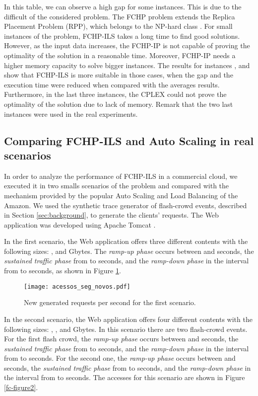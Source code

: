 	In this table, we can observe a high gap for some instances. This is due to the difficult of the considered problem. The FCHP problem extends the Replica Placement Problem (RPP), which belongs to the NP-hard class \cite{aioffi05}. For small instances of the problem,  FCHP-ILS   takes a long time to find good solutions. However, as the input data increases, the FCHP-IP is not capable of proving the optimality of the solution in a reasonable time. Moreover,  FCHP-IP needs a higher memory capacity to solve bigger instances.  The results for instances ,  and  show that FCHP-ILS is more suitable in those cases, when  the gap and the execution time were reduced when compared with the averages results. Furthermore, in the last three instances, the CPLEX could not prove the optimality of the solution due to lack of memory. Remark that the two last instances were used in the real experiments.
	
\subsection{Comparing FCHP-ILS and Auto Scaling in real scenarios}	
		
	In order to analyze the performance of  FCHP-ILS  in a  commercial cloud, we executed it in two smalls scenarios of the problem and compared with the mechanism provided by the  popular  Auto Scaling and Load Balancing of the Amazon.
	We used the synthetic trace generator of flash-crowd events,  described in Section \ref{sec:background}, to generate the  clients'  requests.  The  Web application was developed using Apache Tomcat  \cite{tomcat}.
	
	In the first scenario, the Web application offers  three different contents  with  the following sizes: ,  and  Gbytes. The \textit{ramp-up phase} occurs between  and  seconds, the \textit{sustained traffic phase} from  to  seconds,  and the \textit{ramp-down phase} in the interval from  to  seconds, as shown in  Figure \ref{fc-figure1}. 
	
	\begin{figure}[ht]
\centering
\begin{center}
\texttt{[image: acessos\_seg\_novos.pdf]} 
\end{center}
\caption{New generated requests per second for the first scenario.}
\label{fc-figure1}
\end{figure}

	
	In the second scenario, the Web application offers four different contents  with  the following sizes: , ,  and  Gbytes. In this scenario there are two flash-crowd events. For the first flash crowd, the \textit{ramp-up phase} occurs between  and  seconds, the \textit{sustained traffic phase} from  to  seconds,  and the \textit{ramp-down phase} in the interval from  to  seconds. For the second one,  the \textit{ramp-up phase} occurs between  and  seconds, the \textit{sustained traffic phase} from  to  seconds,  and the \textit{ramp-down phase} in the interval from  to  seconds. The accesses for this scenario are shown in Figure \ref{fc-figure2}. 
	
